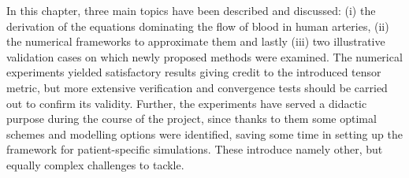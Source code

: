 \begin{tcolorbox}[conclusions]

	In this chapter, three main topics have been described and discussed: (i) the derivation of the equations dominating the flow of blood in human arteries, (ii) the numerical frameworks to approximate them and lastly (iii) two illustrative validation cases on which newly proposed methods were examined. The numerical experiments yielded satisfactory results giving credit to the introduced tensor metric, but more extensive verification and convergence tests should be carried out to confirm its validity. Further, the experiments have served a didactic purpose during the course of the project, since thanks to them some optimal schemes and modelling options were identified, saving some time in setting up the framework for patient-specific simulations. These introduce namely other, but equally complex challenges to tackle.
\end{tcolorbox}

\newpage

{\footnotesize}